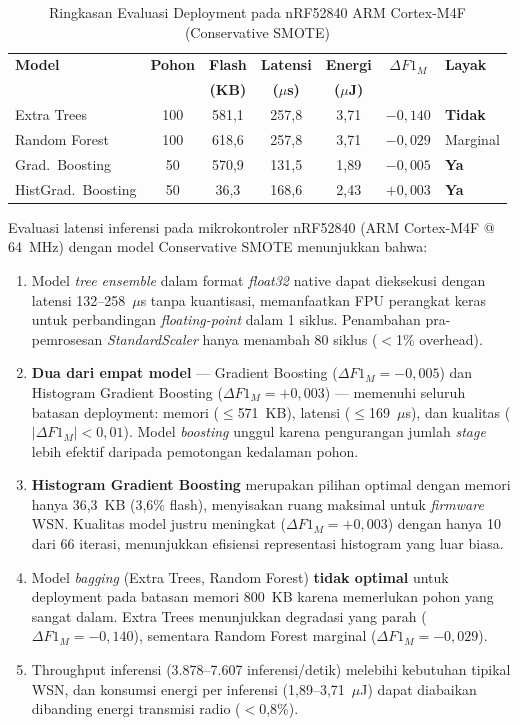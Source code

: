 \begin{table}[htbp]
\centering
\caption{Ringkasan Evaluasi Deployment pada nRF52840 ARM Cortex-M4F (Conservative SMOTE)}
\label{tab:arm_summary}
\begin{tabular}{lcccccl}
\hline
\textbf{Model} & \textbf{Pohon} & \textbf{Flash} & \textbf{Latensi} & \textbf{Energi} & \textbf{$\Delta F1_M$} & \textbf{Layak} \\
 & & \textbf{(KB)} & \textbf{($\mu$s)} & \textbf{($\mu$J)} & & \\
\hline
Extra Trees & 100 & 581,1 & 257,8 & 3,71 & $-0{,}140$ & \textbf{Tidak} \\
Random Forest & 100 & 618,6 & 257,8 & 3,71 & $-0{,}029$ & Marginal \\
Grad.\ Boosting & 50 & 570,9 & 131,5 & 1,89 & $-0{,}005$ & \textbf{Ya} \\
HistGrad.\ Boosting & 50 & 36,3 & 168,6 & 2,43 & $+0{,}003$ & \textbf{Ya} \\
\hline
\end{tabular}
\end{table}

Evaluasi latensi inferensi pada mikrokontroler nRF52840 (ARM Cortex-M4F @ 64~MHz) dengan model Conservative SMOTE menunjukkan bahwa:

\begin{enumerate}
    \item Model \textit{tree ensemble} dalam format \textit{float32} native dapat dieksekusi dengan latensi 132--258~$\mu$s tanpa kuantisasi, memanfaatkan FPU perangkat keras untuk perbandingan \textit{floating-point} dalam 1 siklus. Penambahan pra-pemrosesan \textit{StandardScaler} hanya menambah 80 siklus ($<$1\% overhead).

    \item \textbf{Dua dari empat model} --- Gradient Boosting ($\Delta F1_M = -0{,}005$) dan Histogram Gradient Boosting ($\Delta F1_M = +0{,}003$) --- memenuhi seluruh batasan deployment: memori ($\leq$571~KB), latensi ($\leq$169~$\mu$s), dan kualitas ($|\Delta F1_M| < 0{,}01$). Model \textit{boosting} unggul karena pengurangan jumlah \textit{stage} lebih efektif daripada pemotongan kedalaman pohon.

    \item \textbf{Histogram Gradient Boosting} merupakan pilihan optimal dengan memori hanya 36,3~KB (3,6\% flash), menyisakan ruang maksimal untuk \textit{firmware} WSN. Kualitas model justru meningkat ($\Delta F1_M = +0{,}003$) dengan hanya 10 dari 66 iterasi, menunjukkan efisiensi representasi histogram yang luar biasa.

    \item Model \textit{bagging} (Extra Trees, Random Forest) \textbf{tidak optimal} untuk deployment pada batasan memori 800~KB karena memerlukan pohon yang sangat dalam. Extra Trees menunjukkan degradasi yang parah ($\Delta F1_M = -0{,}140$), sementara Random Forest marginal ($\Delta F1_M = -0{,}029$).

    \item Throughput inferensi (3.878--7.607 inferensi/detik) melebihi kebutuhan tipikal WSN, dan konsumsi energi per inferensi (1,89--3,71~$\mu$J) dapat diabaikan dibanding energi transmisi radio ($<$0,8\%).
\end{enumerate}
